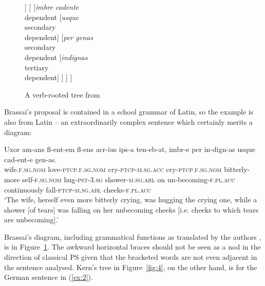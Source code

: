 \documentclass[output=paper]{langscibook}
\begin{document}
\begin{figure}
	\centering
\begin{forest}
[\emph{tenebat}\\governing verb
	[\emph{flentem}\\dependent]
	[\emph{Uxor}\\dependent
		[\emph{amans}\\attribute]
		[\emph{ipsa}\\attribute]
		[\emph{flens}\\attribute
			[\emph{acrius}\\tertiary\\dependent]
		]
	]
	[\emph{imbre cadente}\\dependent
		[\emph{usque}\\secondary\\dependent]
		[\emph{per genas}\\secondary\\dependent
			[\emph{indignas}\\tertiary\\dependent]
		]
	]
]
\end{forest}
	\caption{A verb-rooted tree from \citep{Brassai1873a}}
	\label{fig:3}
\end{figure}%

 
Brassai’s proposal is contained in a school grammar of Latin, so the example is also from Latin – an extraordinarily complex sentence which certainly merits a diagram:

\ea
\label{ex:1}
\gll Uxor am-ans fl-ent-em fl-ens acr-ius ips-a ten-eb-at, imbr-e per in-dign-as usque cad-ent-e gen-as.\\
     wife\textsc{.f.sg.nom} love\textsc{-ptcp.f.sg.nom} cry\textsc{-ptcp-m.sg.acc} cry\textsc{-ptcp.f.sg.nom} bitterly-more self\textsc{-f.sg.nom} hug\textsc{-pst-3.sg} shower\textsc{-m.sg.abl} on un-becoming\textsc{-f.pl.acc} continuously fall\textsc{-ptcp-m.sg.abl} cheeks\textsc{-f.pl.acc}\\
	\glt ‘The wife, herself even more bitterly crying, was hugging the crying one, while a shower [of tears] was falling on her unbecoming cheeks [i.e. cheeks to which tears are unbecoming].’
\z

Brassai’s diagram, including grammatical functions as translated by the authors \citep{ImrenyiVladarTBA}, is in Figure~\ref{fig:3}. The awkward horizontal braces  should not be seen as a nod in the direction of classical PS given that the bracketed words are not even adjacent in the sentence analysed. Kern’s tree in Figure~\ref{fig:4}, on the other hand, is for the German sentence in (\ref{ex:2}).
\end{document}
